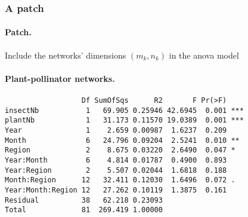 \documentclass[8pt]{beamer}
\begin{document}
\begin{frame}[fragile] \frametitle{A patch}

  \paragraph{Patch.} Include the networks' dimensions $(m_k, n_k)$ in the anova model
  
  \bigskip \pause
  \paragraph{Plant-pollinator networks.}   {\small
\begin{verbatim}
                  Df SumOfSqs      R2       F Pr(>F)    
insectNb           1   69.905 0.25946 42.6945  0.001 ***
plantNb            1   31.173 0.11570 19.0389  0.001 ***
Year               1    2.659 0.00987  1.6237  0.209    
Month              6   24.796 0.09204  2.5241  0.010 ** 
Region             2    8.675 0.03220  2.6490  0.047 *  
Year:Month         6    4.814 0.01787  0.4900  0.893    
Year:Region        2    5.507 0.02044  1.6818  0.188    
Month:Region      12   32.411 0.12030  1.6496  0.072 .  
Year:Month:Region 12   27.262 0.10119  1.3875  0.161    
Residual          38   62.218 0.23093                   
Total             81  269.419 1.00000                   
\end{verbatim} }

\end{frame}

\end{document}
